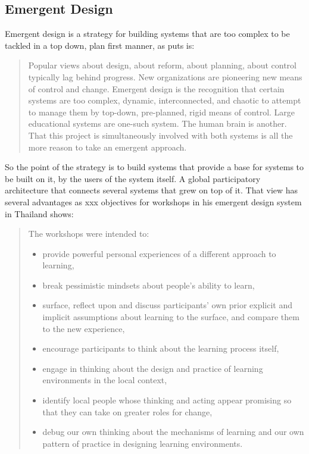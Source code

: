 \subsection{Emergent Design}

Emergent design is a strategy for building systems that are too complex to be
tackled in a top down, plan first manner, as
\cite{education:cavallo__technological_fluency} puts is:
\begin{quotation}
Popular views about design, about reform, about planning, about control
typically lag behind progress. New organizations are pioneering new means of
control and change.  Emergent design is the recognition that certain systems are
too complex, dynamic, interconnected, and chaotic to attempt to manage them by
top-down, pre-planned, rigid means of control. Large educational systems are
one-such system. The human brain is another.  That this project is
simultaneously involved with both systems is all the more reason to take an
emergent approach.
\end{quotation}

So the point of the strategy is to build systems that provide a base for systems
to be built on it, by the users of the system itself. A global participatory architecture
that connects several systems that grew on top of it. That view has several
advantages as xxx objectives for workshops in his emergent design system in
Thailand shows:

\begin{quote}
  The workshops were intended to:
  \begin{itemize}

 \item provide powerful personal
experiences of a different approach to learning,

 \item break pessimistic mindsets about people’s ability to learn,

 \item surface, reflect upon and discuss participants’ own prior explicit and
 implicit assumptions about learning to the surface, and compare them to the new
 experience,

 \item encourage participants to think about the learning process itself,

 \item engage in thinking about the design and practice of learning environments
 in the local context,

 \item identify local people whose thinking and acting appear promising so that
 they can take on greater roles for change,

 \item debug our own thinking about the mechanisms of learning and our own
 pattern of practice in designing learning environments.  

 \end{itemize}
\end{quote}

